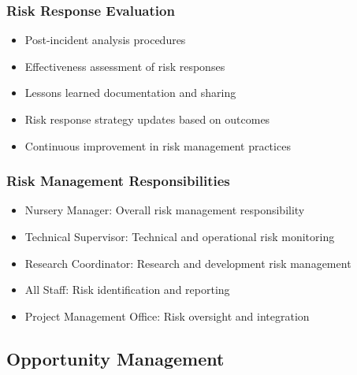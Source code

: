 \subsubsection{Risk Response Evaluation}
\begin{itemize}
    \item Post-incident analysis procedures
    \item Effectiveness assessment of risk responses
    \item Lessons learned documentation and sharing
    \item Risk response strategy updates based on outcomes
    \item Continuous improvement in risk management practices
\end{itemize}

\subsubsection{Risk Management Responsibilities}
\begin{itemize}
    \item Nursery Manager: Overall risk management responsibility
    \item Technical Supervisor: Technical and operational risk monitoring
    \item Research Coordinator: Research and development risk management
    \item All Staff: Risk identification and reporting
    \item Project Management Office: Risk oversight and integration
\end{itemize}

\subsection{Opportunity Management}

